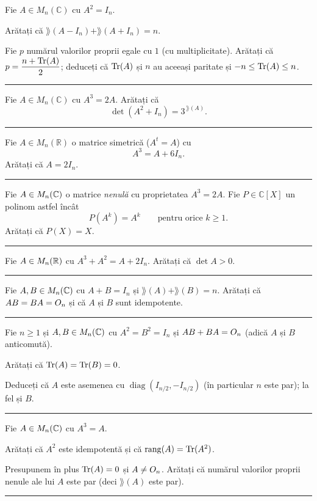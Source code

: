 Fie $A\in M_n(\mathbb{C})$ cu $A^2=I_n$.
\begin{parti}
  \item Arătați că $\rang(A-I_n)+\rang(A+I_n)=n$.
  \item Fie $p$ numărul valorilor proprii egale cu $1$ (cu multiplicitate). Arătați că $p=\dfrac{n+\operatorname{Tr}(A)}{2}$; deduceți că $\operatorname{Tr}(A)$ și $n$ au aceeași paritate și $-n\le\operatorname{Tr}(A)\le n$.
\end{parti}
\vspace{1mm}\hrule

Fie $A\in M_n(\mathbb{C})$ cu $A^3=2A$. Arătați că
\[ \det(A^2+I_n)=3^{\,\rang(A)}. \]
\vspace{1mm}\hrule

Fie $A\in M_n(\mathbb{R})$ o matrice simetrică ($A^t=A$) cu
\[ A^3=A+6I_n. \]
Arătați că $A=2I_n$.
\vspace{1mm}\hrule

Fie $A\in M_n(\mathbb{C})$ o matrice \emph{nenulă} cu proprietatea $A^3=2A$. Fie $P\in\mathbb{C}[X]$ un polinom astfel încât
\[ P(A^k)=A^k\qquad\text{pentru orice }k\ge1 . \]
Arătați că $P(X)=X$.
\vspace{1mm}\hrule

Fie $A \in M_n(\mathbb{R})$ cu $A^3 + A^2 = A + 2I_n$. Arătați că $\det A > 0$.
\vspace{1mm}\hrule

Fie $A,B \in M_n(\mathbb{C})$ cu $A+B = I_n$ și $\rang(A)+\rang(B) = n$. Arătați că
$AB = BA = O_n$ și că $A$ și $B$ sunt idempotente.
\vspace{1mm}\hrule

Fie $n\ge1$ și $A,B\in M_n(\mathbb{C})$ cu $A^2=B^2=I_n$ și $AB+BA=O_n$ (adică $A$ și $B$ anticomută).
\begin{parti}
  \item Arătați că $\operatorname{Tr}(A)=\operatorname{Tr}(B)=0$.
  \item Deduceți că $A$ este asemenea cu $\operatorname{diag}(I_{n/2},-I_{n/2})$ (în particular $n$ este par); la fel și $B$.
\end{parti}
\vspace{1mm}\hrule

Fie $A\in M_n(\mathbb{C})$ cu $A^3=A$.
\begin{parti}
  \item Arătați că $A^2$ este idempotentă și că $\operatorname{rang}(A)=\operatorname{Tr}(A^2)$.
  \item Presupunem în plus $\operatorname{Tr}(A)=0$ și $A\neq O_n$. Arătați că numărul valorilor proprii nenule ale lui $A$ este par (deci $\rang(A)$ este par).
\end{parti}
\vspace{1mm}\hrule

